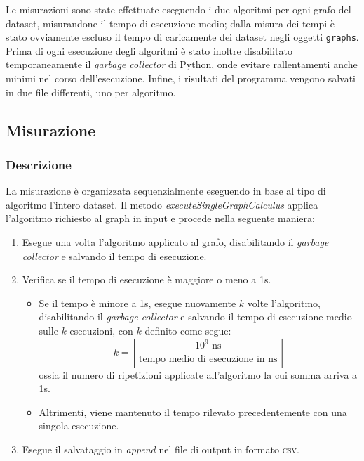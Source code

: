 Le misurazioni sono state effettuate eseguendo i due algoritmi per ogni grafo del dataset, misurandone il tempo di esecuzione medio; dalla misura dei tempi è stato ovviamente escluso il tempo di caricamente dei dataset negli oggetti \texttt{graphs}. Prima di ogni esecuzione degli algoritmi è stato inoltre disabilitato temporaneamente il \textit{garbage collector} di Python, onde evitare rallentamenti anche minimi nel corso dell'esecuzione. Infine, i risultati del programma vengono salvati in due file differenti, uno per algoritmo.

\subsection{Misurazione}

\subsubsection{Descrizione} 
\label{guida_misurazioni}

La misurazione è organizzata sequenzialmente eseguendo in base al tipo di algoritmo l'intero dataset. Il metodo \textit{executeSingleGraphCalculus} applica l'algoritmo richiesto al graph in input e procede nella seguente maniera:

\begin{enumerate}
    \item Esegue una volta l'algoritmo applicato al grafo, disabilitando il \textit{garbage collector} e salvando il tempo di esecuzione.
    \item Verifica se il tempo di esecuzione è maggiore o meno a 1s.
    \begin{itemize}
        \item Se il tempo è minore a 1s, esegue nuovamente \(k\) volte l'algoritmo, disabilitando il \textit{garbage collector} e salvando il tempo di esecuzione medio sulle \(k\) esecuzioni, con \(k\) definito come segue:  \[ k = \left\lfloor\frac{10^9 \textrm{ ns}}{\textrm{tempo medio di esecuzione in ns}}\right\rfloor\]
        ossia il numero di ripetizioni applicate all'algoritmo la cui somma arriva a 1s.
        \item Altrimenti, viene mantenuto il tempo rilevato precedentemente con una singola esecuzione.
    \end{itemize}
    \item Esegue il salvataggio in \textit{append} nel file di output in formato \textsc{csv}.
\end{enumerate}


